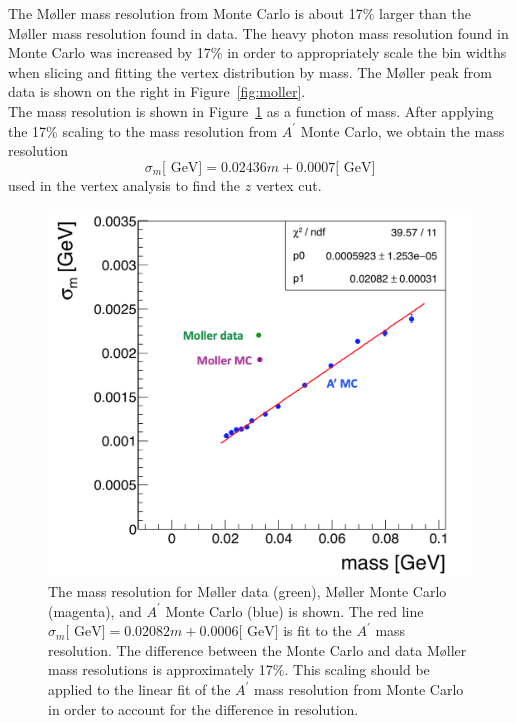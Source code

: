 The M\o ller mass resolution from Monte Carlo is about 17$\%$ larger than the M\o ller mass resolution found in data. The heavy photon mass resolution found in Monte Carlo was increased by 17$\%$ in order to appropriately scale the bin widths when slicing and fitting the vertex distribution by mass. The M\o ller peak from data is shown on the right in Figure~\ref{fig:moller}. \\
\indent The mass resolution is shown in Figure~\ref{fig:massRes} as a function of mass. After applying the 17$\%$ scaling to the mass resolution from $A^{\prime}$ Monte Carlo, we obtain the mass resolution
\begin{equation}
\label{eq:massresScaled}
\sigma_m\textrm{[ GeV]} = 0.02436m+0.0007 \textrm{[ GeV]}
\end{equation}
used in the vertex analysis to find the $z$ vertex cut. 

\begin{figure}[hbt]
\begin{minipage}{0.65\textwidth}
\includegraphics[width=\textwidth]{pics/searching/massResolution.png}
\end{minipage}\hfill\begin{minipage}{0.32\textwidth}
\caption[Mass resolution compared between Monte Carlo and data]{ \label{fig:massRes} \baselineskip 11pt
The mass resolution for M\o ller data (green), M\o ller Monte Carlo (magenta), and $A^{\prime}$ Monte Carlo (blue) is shown. The red line $\sigma_m\textrm{[ GeV]} = 0.02082m+0.0006\textrm{[ GeV]}$ is fit to the $A^{\prime}$ mass resolution. The difference between the Monte Carlo and data M\o ller mass resolutions is approximately 17$\%$. This scaling should be applied to the linear fit of the $A^{\prime}$ mass resolution from Monte Carlo in order to account for the difference in resolution.
}
\end{minipage}
\end{figure}

